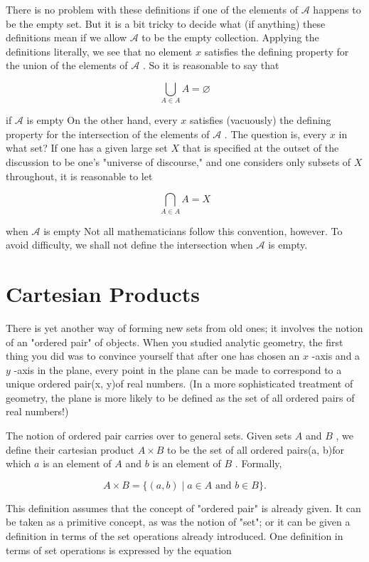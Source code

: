 There is no problem with these definitions if one of the elements of \(\mathcal{A}\) happens to be the empty set. But it is a bit tricky to decide what (if anything) these definitions mean if we allow \(\mathcal{A}\) to be the empty collection. Applying the definitions literally, we see that no element \(x\) satisfies the defining property for the union of the elements of \(\mathcal{A}\) . So it is reasonable to say that

\[
\mathop{\bigcup }\limits_{{A \in  A}}A = \varnothing
\]

if \(\mathcal{A}\) is empty On the other hand, every \(x\) satisfies (vacuously) the defining property for the intersection of the elements of \(\mathcal{A}\) . The question is, every \(x\) in what set? If one has a given large set \(X\) that is specified at the outset of the discussion to be one’s "universe of discourse," and one considers only subsets of \(X\) throughout, it is reasonable to let

\[
\mathop{\bigcap }\limits_{{A \in  A}}A = X
\]

when \(\mathcal{A}\) is empty Not all mathematicians follow this convention, however. To avoid difficulty, we shall not define the intersection when \(\mathcal{A}\) is empty.

\section*{Cartesian Products}

There is yet another way of forming new sets from old ones; it involves the notion of an "ordered pair" of objects. When you studied analytic geometry, the first thing you did was to convince yourself that after one has chosen an \(x\) -axis and a \(y\) -axis in the plane, every point in the plane can be made to correspond to a unique ordered pair(x, y)of real numbers. (In a more sophisticated treatment of geometry, the plane is more likely to be defined as the set of all ordered pairs of real numbers!)

The notion of ordered pair carries over to general sets. Given sets \(A\) and \(B\) , we define their cartesian product \(A \times  B\) to be the set of all ordered pairs(a, b)for which \(a\) is an element of \(A\) and \(b\) is an element of \(B\) . Formally,

\[
A \times  B = \{ \left( {a,b}\right)  \mid  a \in  A\text{ and }b \in  B\} .
\]

This definition assumes that the concept of "ordered pair" is already given. It can be taken as a primitive concept, as was the notion of "set"; or it can be given a definition in terms of the set operations already introduced. One definition in terms of set operations is expressed by the equation

